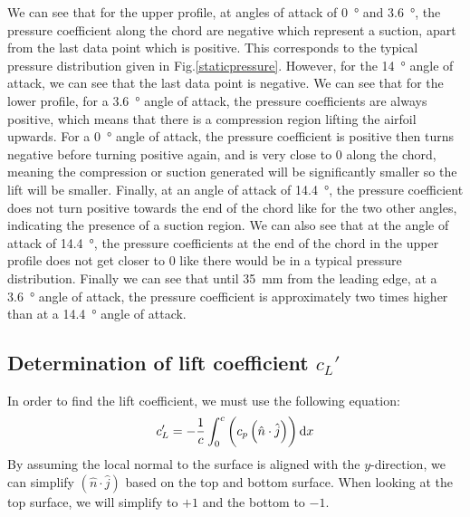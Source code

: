 \documentclass[11pt]{article}
\begin{document}
We can see that for the upper profile, at angles of attack of \SI{0}{\degree} and \SI{3.6}{\degree}, the pressure coefficient along the chord are negative which represent a suction, apart from the last data point which is positive. This corresponds to the typical pressure distribution given in Fig.\ref{staticpressure}. However, for the \SI{14}{\degree} angle of attack, we can see that the last data point is negative. We can see that for the lower profile, for a \SI{3.6}{\degree} angle of attack, the pressure coefficients are always positive, which means that there is a compression region lifting the airfoil upwards. For a \SI{0}{\degree} angle of attack, the pressure coefficient is positive then turns negative before turning positive again, and is very close to 0 along the chord, meaning the compression or suction generated will be significantly smaller so the lift will be smaller. Finally, at an angle of attack of \SI{14.4}{\degree}, the pressure coefficient does not turn positive towards the end of the chord like for the two other angles, indicating the presence of a suction region. We can also see that at the angle of attack of \SI{14.4}{\degree}, the pressure coefficients at the end of the chord in the upper profile does not get closer to 0 like there would be in a typical pressure distribution. Finally we can see that until \SI{35}{\milli\meter} from the leading edge, at a \SI{3.6}{\degree} angle of attack, the pressure coefficient is approximately two times higher than at a \SI{14.4}{\degree} angle of attack.
\subsection*{Determination of lift coefficient $c_L'$}
In order to find the lift coefficient, we must use the following equation:
\begin{align}
  c_L' = -\frac{1}{c} \int_0^c \left(c_p \left(\hat{n}\cdot \hat{j}\right)\right)\dif x
\end{align}
By assuming the local normal to the surface is aligned with the $y$-direction, we can simplify $\left(\hat{n}\cdot \hat{j}\right)$ based on the top and bottom surface. When looking at the top surface, we will simplify to $+1$ and the bottom to $-1$. 
\end{document}
